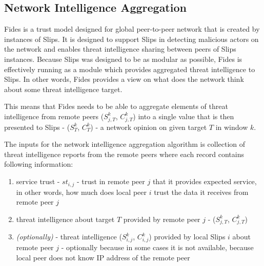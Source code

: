 \subsection{Network Intelligence Aggregation}
Fides is a trust model designed for global peer-to-peer network that is created by instances of Slips.
It is designed to support Slips in detecting malicious actors on the network and enables threat intelligence sharing between peers of Slips instances.
Because Slips was designed to be as modular as possible, Fides is effectively running as a module which provides aggregated threat intelligence to Slips. 
In other words, Fides provides a view on what does the network think about some threat intelligence target.

This means that Fides needs to be able to aggregate elements of threat intelligence from remote peers ($S^{k}_{j, T}$, $C^{k}_{j, T}$) into a single value that is then presented to Slips - ($S^{k}_{T}$, $C^{k}_{T}$) - a network opinion on given target $T$ in window $k$.
\vspace{5mm}

\noindent
The inputs for the network intelligence aggregation algorithm is collection of threat intelligence reports from the remote peers where each record contains following information:
\begin{enumerate}
\item service trust - $st_{i, j}$ - trust in remote peer $j$ that it provides expected service, in other words, how much does local peer $i$ trust the data it receives from remote peer $j$
\item threat intelligence about target $T$ provided by remote peer $j$ - ($S^{k}_{j, T}$, $C^{k}_{j, T}$)
\item \textit{(optionally)} - threat intelligence ($S^{k}_{i, j}$, $C^{k}_{i, j}$) provided by local Slips $i$ about remote peer $j$ - optionally because in some cases it is not available, because local peer does not know IP address of the remote peer
\end{enumerate}
